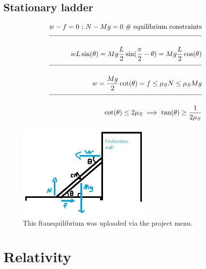 \documentclass[a4paper]{article}
\newcommand{\eqComment}[1]{\text{  \# #1}}
\newcommand{\eqSep}{\text{ ;  }}
\newcommand{\n}{\\[1.5ex] \hline \nonumber \\[0ex]}
\begin{document}
\subsection{Stationary ladder}
\begin{tcolorbox}
\begin{align}
   w - f = 0 \eqSep N - M g = 0 \eqComment{equilibrium constraints}
\n w L \sin(\theta) = M g \frac{L}{2} \sin(\frac{\pi}{2} - \theta) = M g \frac{L}{2} \cos(\theta)
\n w = \frac{M g}{2} \cot(\theta) = f \leq \mu_S N \leq \mu_S M g
\n \cot(\theta) \leq 2 \mu_S \implies \tan(\theta) \geq \frac{1}{2 \mu_S}
\end{align}
\end{tcolorbox}

\begin{figure}[h]
\centering
\includegraphics[width=0.6\textwidth]{figures/ftauequilibrium.jpg}
\caption{\label{fig:ftauequilibrium}This ftauequilibrium was uploaded via the project menu.}
\end{figure} \FloatBarrier

\section{Relativity}
\end{document}
